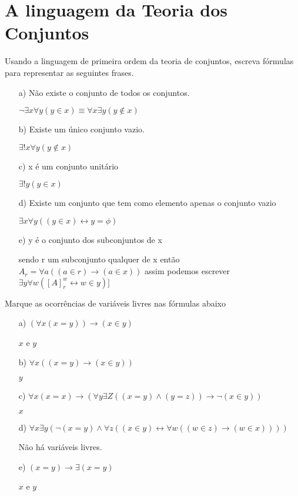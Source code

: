 \chapter{A linguagem da Teoria dos Conjuntos}

\begin{exercicio}
	Usando a linguagem de primeira ordem da teoria de conjuntos, escreva fórmulas para representar as seguintes frases.
\end{exercicio}

\begin{solucao}
\begin{enumerate}
	\item[a)] Não existe o conjunto de todos os conjuntos.
    \item[] $\neg \exists x \forall y (y \in x) \equiv \forall x \exists y (y \notin x)$
	\item[b)] Existe um único conjunto vazio.
    \item[] $\exists ! x \forall y (y \notin x)$
	\item[c)] x é um conjunto unitário
    \item[] $\exists ! y (y \in x)$
	\item[d)] Existe um conjunto que tem como elemento apenas o conjunto vazio
    \item[] $\exists x \forall y ((y \in x) \leftrightarrow y = \phi)$
	\item[e)] y é o conjunto dos subconjuntos de x 
    \item[] sendo r um subconjunto qualquer de x então $ A_r = \forall a ((a \in r) \rightarrow (a \in x)) $ assim podemos escrever $ \exists y \forall w ([A]_r^w \leftrightarrow w \in y) ]$
    
\end{enumerate}

\end{solucao}

\begin{exercicio}
	Marque as ocorrências de variáveis livres nas fórmulas abaixo
\end{exercicio}

\begin{enumerate}
	\item[a)] $(\forall x (x=y)) \rightarrow (x \in y ) $
    \item[] $x$ e $y$
	\item[b)] $ \forall x ((x=y) \rightarrow (x \in y))$
    \item[] $y$
	\item[c)] $\forall x(x=x) \rightarrow (\forall y \exists Z ((x=y) \land (y=z)) \rightarrow \neg(x\in y))$
    \item[] $x$
	\item[d)] $ \forall x \exists y(\neg(x=y) \land \forall z ((x \in y) \leftrightarrow \forall w ((w \in z ) \rightarrow (w \in x )))) $
    \item[] Não há variáveis livres.
	\item[e)] $(x=y)\rightarrow \exists (x=y) $
    \item[] $x$ e $y$
\end{enumerate}

